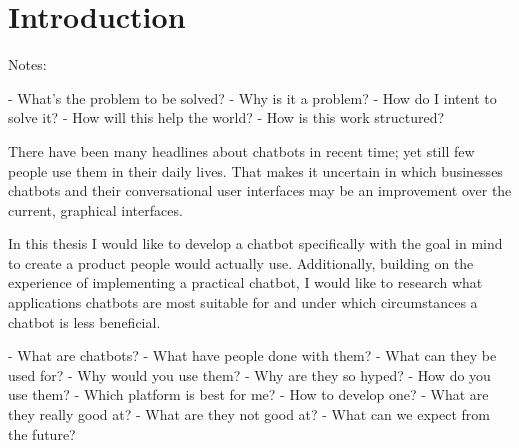 \chapter{Introduction}

Notes:

-	What's the problem to be solved?
-	Why is it a problem?
-	How do I intent to solve it?
-	How will this help the world?
-	How is this work structured?


There have been many headlines about chatbots in recent time; yet still few people use them in their daily lives. That makes it uncertain in which businesses chatbots and their conversational user interfaces may be an improvement over the current, graphical interfaces.

In this thesis I would like to develop a chatbot specifically with the goal in mind to create a product people would actually use. Additionally, building on the experience of implementing a practical chatbot, I would like to research what applications chatbots are most suitable for and under which circumstances a chatbot is less beneficial.

-	What are chatbots?
-	What have people done with them?
-	What can they be used for?
-	Why would you use them?
-	Why are they so hyped?
-	How do you use them?
-	Which platform is best for me?
-	How to develop one?
-	What are they really good at?
-	What are they not good at?
-	What can we expect from the future?
